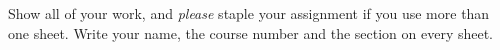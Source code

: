 
\pagestyle{fancy} 
Show all of your work, and \emph{please} staple your assignment if you use more than one sheet. Write your name, the course number and the section on every sheet. 

\begin{enumerate} 








\end{enumerate}


